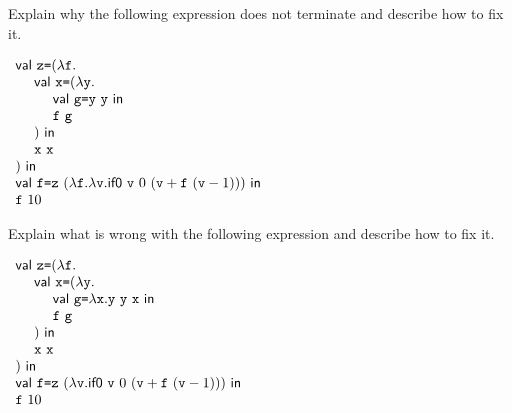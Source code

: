 \begin{exercise}

Explain why the following expression does not terminate and describe how
  to fix it.

$\begin{array}{l}
  \ebind{\cz}{(\efun{\cf}{\\
  \ \ \ \ \ebind{\cx}{(\efun{\cy}{\\
  \ \ \ \ \ \ \ \ \ebind{\code{g}}{\eapp{\cy}{\cy}}{\\
  \ \ \ \ \ \ \ \ \eapp{\cf}{\code{g}}}}\\
  \ \ \ \ )}{\\
  \ \ \ \ \eapp{\cx}{\cx}}}\\
  )}{\\
  \ebind{\cf}{\eapp{\cz}{(\efun{\cf}{\efun{\cv}{\sumbodyfv}})}}{\\
  \eapp{\cf}{10}
  }
}
\end{array}$

\end{exercise}

\begin{exercise}

  Explain what is wrong with the following expression and describe how
  to fix it.

$\begin{array}{l}
  \ebind{\cz}{(\efun{\cf}{\\
  \ \ \ \ \ebind{\cx}{(\efun{\cy}{\\
  \ \ \ \ \ \ \ \ \ebind{\code{g}}{\efun{\cx}{\eapp{\eapp{\cy}{\cy}}{\cx}}}{\\
  \ \ \ \ \ \ \ \ \eapp{\cf}{\code{g}}}}\\
  \ \ \ \ )}{\\
  \ \ \ \ \eapp{\cx}{\cx}}}\\
  )}{\\
  \ebind{\cf}{\eapp{\cz}{({\efun{\cv}{\sumbodyfv}})}}{\\
  \eapp{\cf}{10}
  }
}
\end{array}$

\end{exercise}

